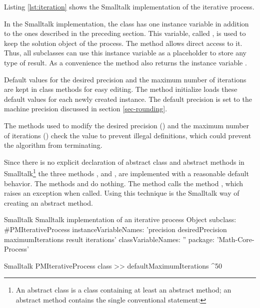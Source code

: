 Listing \ref{lst:iteration} shows the Smalltalk implementation of the iterative process.

In the Smalltalk implementation, the class 
has one instance variable in addition to the ones described in the
preceding section. This variable, called , is used to
keep the solution object of the process. The method 
allows direct access to it. Thus, all subclasses can use this
instance variable as a placeholder to store any type of result. As
a convenience the method  also returns the instance
variable .

Default values for the desired precision and the maximum number of
iterations are kept in class methods for easy editing. The method
initialize loads these default values for each newly created
instance. The default precision is set to the machine precision
discussed in section \ref{sec-rounding}.

The methods used to modify the desired precision () and the maximum number of iterations () check the value to prevent illegal
definitions, which could prevent the algorithm from terminating.

Since there is no explicit declaration of abstract class and abstract methods in Smalltalk\footnote{An abstract class is a class containing at least an abstract method; an abstract method contains the single conventional statement: } the three methods ,  and , are implemented with a reasonable default behavior.
The methods  and  do nothing. The method  calls the method , which raises an
exception when called.
Using this technique is the Smalltalk way of creating an abstract method.
\begin{listing}[label=lst:iteration]{Smalltalk}
{Smalltalk implementation of an iterative process}
Object subclass: #PMIterativeProcess
   instanceVariableNames: 'precision desiredPrecision maximumIterations result iterations'
   classVariableNames: ''
   package: 'Math-Core-Process'
\end{listing}

\begin{displaycode}{Smalltalk}
PMIterativeProcess class >> defaultMaximumIterations
    ^50
\end{displaycode}

